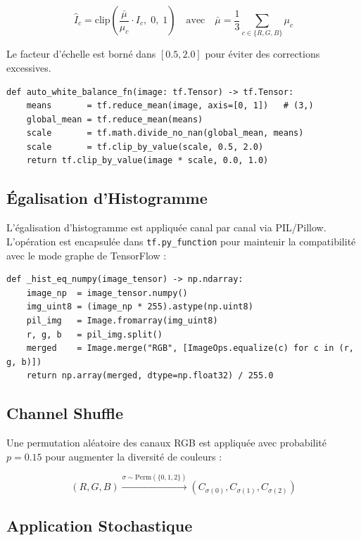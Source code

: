 \[
  \hat{I}_c = \text{clip}\!\left(\frac{\bar{\mu}}{\mu_c} \cdot I_c,\; 0,\; 1\right)
  \quad \text{avec} \quad
  \bar{\mu} = \frac{1}{3}\sum_{c \in \{R,G,B\}} \mu_c
\]

Le facteur d'échelle est borné dans $[0.5, 2.0]$ pour éviter des corrections excessives.

\begin{lstlisting}[caption={Implémentation de la white balance gray-world}]
def auto_white_balance_fn(image: tf.Tensor) -> tf.Tensor:
    means       = tf.reduce_mean(image, axis=[0, 1])   # (3,)
    global_mean = tf.reduce_mean(means)
    scale       = tf.math.divide_no_nan(global_mean, means)
    scale       = tf.clip_by_value(scale, 0.5, 2.0)
    return tf.clip_by_value(image * scale, 0.0, 1.0)
\end{lstlisting}

\subsection{Égalisation d'Histogramme}

L'égalisation d'histogramme est appliquée canal par canal via PIL/Pillow. L'opération est encapsulée dans \texttt{tf.py\_function} pour maintenir la compatibilité avec le mode graphe de TensorFlow :

\begin{lstlisting}[caption={Égalisation d'histogramme via tf.py\_function}]
def _hist_eq_numpy(image_tensor) -> np.ndarray:
    image_np  = image_tensor.numpy()
    img_uint8 = (image_np * 255).astype(np.uint8)
    pil_img   = Image.fromarray(img_uint8)
    r, g, b   = pil_img.split()
    merged    = Image.merge("RGB", [ImageOps.equalize(c) for c in (r, g, b)])
    return np.array(merged, dtype=np.float32) / 255.0
\end{lstlisting}

\subsection{Channel Shuffle}

Une permutation aléatoire des canaux RGB est appliquée avec probabilité $p = 0.15$ pour augmenter la diversité de couleurs :

\[
  (R, G, B) \xrightarrow{\sigma \sim \text{Perm}(\{0,1,2\})} (C_{\sigma(0)}, C_{\sigma(1)}, C_{\sigma(2)})
\]

\subsection{Application Stochastique}

